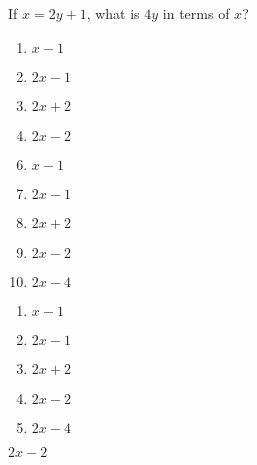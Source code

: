 






 If $x=2y+1$, what is $4y$ in terms of $x$?


\ifsat
	\begin{enumerate}[label=\Alph*)]
		\item   $x-1$
		\item  $2x-1$
		\item  $2x+2$
		\item  $2x-2$%
	\end{enumerate}
\else
\fi

\ifacteven
	\begin{enumerate}[label=\textbf{\Alph*.},itemsep=\fill,align=left]
		\setcounter{enumii}{5}
		\item   $x-1$
		\item  $2x-1$
		\item  $2x+2$
		\addtocounter{enumii}{1}
		\item  $2x-2$%
		\item  $2x-4$
	\end{enumerate}
\else
\fi

\ifactodd
	\begin{enumerate}[label=\textbf{\Alph*.},itemsep=\fill,align=left]
		\item   $x-1$
		\item  $2x-1$
		\item  $2x+2$
		\item  $2x-2$%
		\item  $2x-4$
	\end{enumerate}
\else
\fi

\ifgridin
  $2x-2$%

\else
\fi


